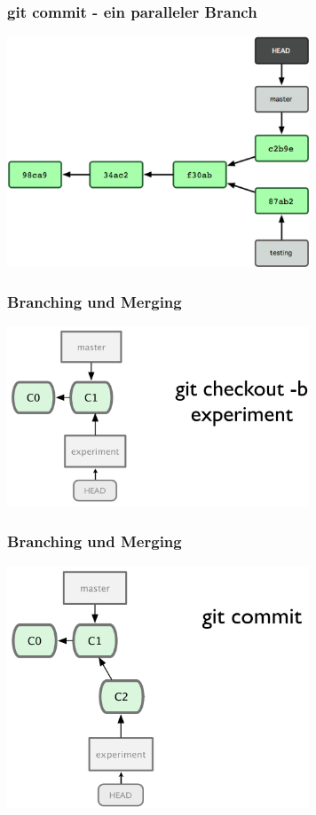 \begin{frame}
  \frametitle{git commit - ein paralleler Branch}
  \begin{center}
    \includegraphics[width=9cm]{img/branch.png}
  \end{center}
\end{frame}

\begin{frame}
  \frametitle{Branching und Merging}
  \begin{center}
    \includegraphics[width=9cm]{img/branch_1.pdf}
  \end{center}
\end{frame}

\begin{frame}
  \frametitle{Branching und Merging}
  \begin{center}
    \includegraphics[width=9cm]{img/branch_2.pdf}
  \end{center}
\end{frame}

